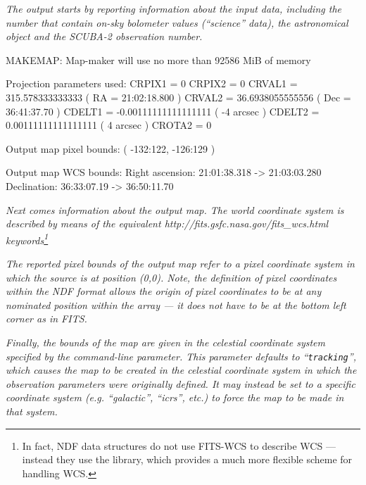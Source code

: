 
\emph{The output starts by reporting information about the input data,
including the number that contain on-sky bolometer values (``science''
data), the astronomical object and the SCUBA-2 observation number.}

\begin{terminalv}

MAKEMAP: Map-maker will use no more than 92586 MiB of memory

   Projection parameters used:
      CRPIX1 = 0
      CRPIX2 = 0
      CRVAL1 = 315.578333333333 ( RA = 21:02:18.800 )
      CRVAL2 = 36.6938055555556 ( Dec = 36:41:37.70 )
      CDELT1 = -0.00111111111111111 ( -4 arcsec )
      CDELT2 = 0.00111111111111111 ( 4 arcsec )
      CROTA2 = 0

   Output map pixel bounds: ( -132:122, -126:129 )

   Output map WCS bounds:
        Right ascension: 21:01:38.318 -> 21:03:03.280
        Declination: 36:33:07.19 -> 36:50:11.70

\end{terminalv}

\emph{Next comes information about the output map. The world coordinate
system is described by means of the equivalent 
{http://fits.gsfc.nasa.gov/fits_wcs.html} keywords\footnote{In fact, NDF
data structures do not use FITS-WCS to describe WCS --- instead they use the
 library, which
provides a much more flexible scheme for handling WCS.}}

\emph{The reported pixel bounds of the output map refer to a pixel coordinate
system in which the source is at position (0,0). Note, the definition of
pixel coordinates within the NDF format allows the origin of pixel
coordinates to be at any nominated position within the array --- it does
not have to be at the bottom left corner as in FITS.}

\emph{Finally, the bounds of the map are given in the celestial coordinate
system specified by the  command-line
parameter.  This parameter defaults to ``\texttt{tracking}'', which causes
the map to be created in the celestial coordinate system in which the
observation parameters were originally defined. It may instead be set to a
specific coordinate system (e.g. ``galactic'', ``icrs'', etc.) to force the
map to be made in that system.}

